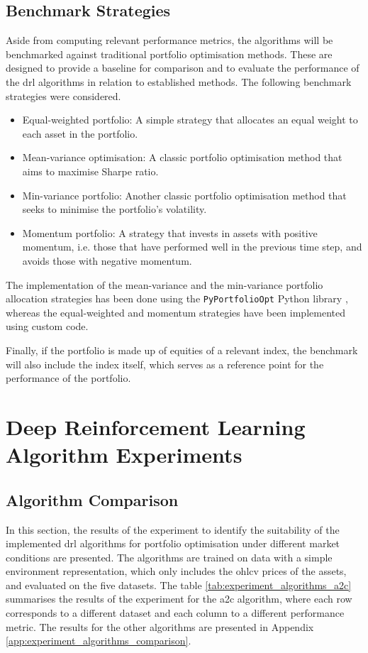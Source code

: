 \subsection{Benchmark Strategies} \label{sec:benchmark-strategies}

Aside from computing relevant performance metrics, the algorithms will be benchmarked against traditional portfolio optimisation methods. These are designed to provide a baseline for comparison and to evaluate the performance of the \acrshort{drl} algorithms in relation to established methods. The following benchmark strategies were considered.
\begin{itemize}
    \item Equal-weighted portfolio: A simple strategy that allocates an equal weight to each asset in the portfolio.
    \item Mean-variance optimisation: A classic portfolio optimisation method that aims to maximise Sharpe ratio.
    \item Min-variance portfolio: Another classic portfolio optimisation method that seeks to minimise the portfolio's volatility.
    \item Momentum portfolio: A strategy that invests in assets with positive momentum, i.e. those that have performed well in the previous time step, and avoids those with negative momentum.
\end{itemize}

The implementation of the mean-variance and the min-variance portfolio allocation strategies has been done using the \texttt{PyPortfolioOpt} Python library \cite{Martin2021}, whereas the equal-weighted and momentum strategies have been implemented using custom code.

Finally, if the portfolio is made up of equities of a relevant index, the benchmark will also include the index itself, which serves as a reference point for the performance of the portfolio. 

\section{Deep Reinforcement Learning Algorithm Experiments} \label{sec:exp-drl-algorithms}

\subsection{Algorithm Comparison} \label{sec:exp-algorithm-comparison}

In this section, the results of the experiment to identify the suitability of the implemented \acrshort{drl} algorithms for portfolio optimisation under different market conditions are presented. The algorithms are trained on data with a simple environment representation, which only includes the \acrshort{ohlcv} prices of the assets, and evaluated on the five datasets. The table \ref{tab:experiment_algorithms_a2c} summarises the results of the experiment for the \acrshort{a2c} algorithm, where each row corresponds to a different dataset and each column to a different performance metric. The results for the other algorithms are presented in Appendix \ref{app:experiment_algorithms_comparison}.

